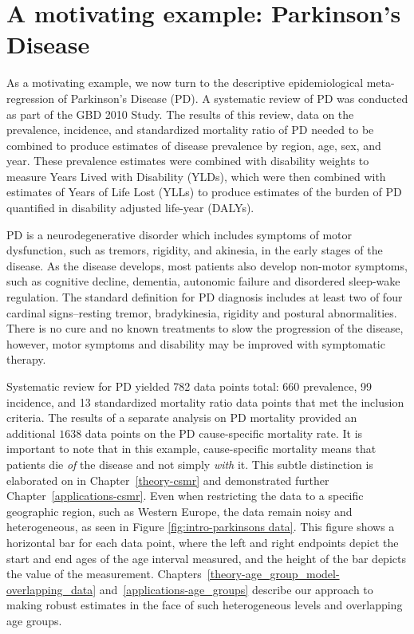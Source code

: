 \section{A motivating example: Parkinson's Disease}
\label{intro-complete_ex}

As a motivating example, we now turn to the descriptive
epidemiological meta-regression of Parkinson's Disease (PD). A
systematic review of PD was conducted as part of the GBD 2010
Study.\cite{GBD_2010_or_parkinsons_paper} The results of this review,
data on the prevalence, incidence, and standardized mortality ratio of PD
needed to be combined to produce estimates of disease prevalence by
region, age, sex, and year.  These prevalence estimates were combined
with disability weights to measure Years Lived with Disability (YLDs),
which were then combined with estimates of Years of Life Lost (YLLs)
to produce estimates of the burden of PD quantified in disability
adjusted life-year (DALYs).

PD is a neurodegenerative disorder which includes symptoms of motor
dysfunction, such as tremors, rigidity, and akinesia, in the early
stages of the disease.  As the disease develops, most patients also
develop non-motor symptoms, such as cognitive decline, dementia,
autonomic failure and disordered sleep-wake regulation.  The standard 
definition for PD diagnosis includes at least two of four cardinal 
signs--resting tremor, bradykinesia, rigidity and postural abnormalities.
There is no cure and no known treatments to slow the progression of the disease,
however, motor symptoms and disability may be improved with
symptomatic therapy.\cite{poewe_natural_2006, pollock_prevalence_1966, larsen_clinical_1994}

Systematic review for PD yielded 782 data points total: 660
prevalence, 99 incidence, and 13 standardized mortality ratio data
points that met the inclusion criteria.  The results of a separate
analysis on PD mortality provided an additional $1638$ data points on
the PD cause-specific mortality rate. It is important to note that in
this example, cause-specific mortality means that patients die
\emph{of} the disease and not simply \emph{with} it.  This subtle
distinction is elaborated on in Chapter~\ref{theory-csmr} and
demonstrated further Chapter~\ref{applications-csmr}.  Even when
restricting the data to a specific geographic region, such as Western
Europe, the data remain noisy and heterogeneous, as seen in Figure
\ref{fig:intro-parkinsons data}. This figure shows a horizontal bar
for each data point, where the left and right endpoints depict the
start and end ages of the age interval measured, and the height of the
bar depicts the value of the measurement. Chapters~\ref{theory-age_group_model-overlapping_data}
and~\ref{applications-age_groups} describe our approach to making
robust estimates in the face of such heterogeneous levels and
overlapping age groups.


